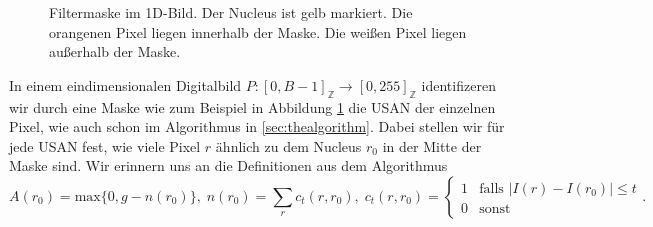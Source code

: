 \documentclass[a4paper, 11pt]{report}
\theoremstyle{definition}
\begin{document}
				\begin{figure}[H]
					\begin{center}
						\caption{Filtermaske im 1D-Bild. Der Nucleus ist gelb markiert. Die orangenen Pixel liegen innerhalb der Maske. Die weißen Pixel liegen außerhalb der Maske.}
						\label{fig:def_maske_1d}
					\end{center}
				\end{figure}

	 			In einem eindimensionalen Digitalbild $P: [0,B-1]_\mathbb{Z} \to [0,255]_\mathbb{Z}$ identifizeren wir durch eine Maske wie zum Beispiel in Abbildung \ref{fig:def_maske_1d} die USAN der einzelnen Pixel, wie auch schon im Algorithmus in \ref{sec:thealgorithm}. Dabei stellen wir für jede USAN fest, wie viele Pixel $r$ ähnlich zu dem Nucleus $r_0$ in der Mitte der Maske sind. Wir erinnern uns an die Definitionen aus dem Algorithmus
				$$
				A(r_0) = \text{max}\{0, g - n(r_0)\},\;
				n(r_0) = \sum_r c_t(r, r_0),\;
				c_t(r, r_0) =
					\begin{cases}
						1 	& \text{falls } |I(r) - I(r_0)| \leq t 	\\
						0 	& \text{sonst}
					\end{cases}.
				$$
\end{document}
